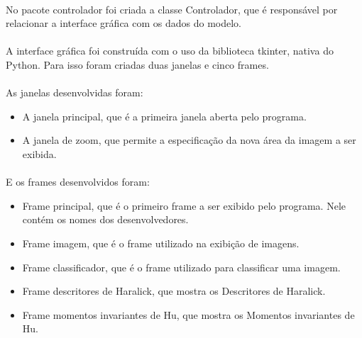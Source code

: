 \documentclass[12pt]{article}
\begin{document}
\paragraph{}No pacote controlador foi criada a classe Controlador, que é responsável por relacionar a interface gráfica com os dados do modelo.

\paragraph{}A interface gráfica foi construída com o uso da biblioteca tkinter, nativa do Python. Para isso foram criadas duas janelas e cinco frames.

\paragraph{}As janelas desenvolvidas foram:

\begin{itemize}
    \item A janela principal, que é a primeira janela aberta pelo programa.

    \item A janela de zoom, que permite a especificação da nova área da imagem a ser exibida.
\end{itemize}

\paragraph{}E os frames desenvolvidos foram:

\begin{itemize}
    \item Frame principal, que é o primeiro frame a ser exibido pelo programa. Nele contém os nomes dos desenvolvedores.

    \item Frame imagem, que é o frame utilizado na exibição de imagens.

    \item Frame classificador, que é o frame utilizado para classificar uma imagem.

    \item Frame descritores de Haralick, que mostra os Descritores de Haralick.

    \item Frame momentos invariantes de Hu, que mostra os Momentos invariantes de Hu.
\end{itemize}
\end{document}
